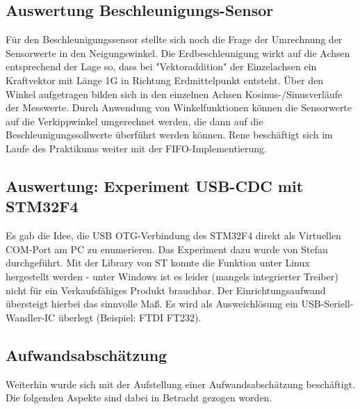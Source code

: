 \subsection{Auswertung Beschleunigungs-Sensor}
Für den Beschleunigungssensor stellte sich noch die Frage der Umrechnung der Sensorwerte in den Neigungswinkel. Die Erdbeschleunigung wirkt auf die Achsen entsprechend der Lage so, dass bei "Vektoraddition" der Einzelachsen ein Kraftvektor mit Länge 1G in Richtung Erdmittelpunkt entsteht. Über den Winkel aufgetragen bilden sich in den einzelnen Achsen Kosinus-/Sinusverläufe der Messwerte. Durch Anwendung von Winkelfunktionen können die Sensorwerte auf die Verkippwinkel umgerechnet werden, die dann auf die Beschleunigungssollwerte überführt werden können. 
Rene beschäftigt sich im Laufe des Praktikums weiter mit der FIFO-Implementierung.

\subsection{Auswertung: Experiment USB-CDC mit STM32F4}
Es gab die Idee, die USB OTG-Verbindung des STM32F4 direkt als Virtuellen COM-Port am PC zu enumerieren. Das Experiment dazu wurde von Stefan durchgeführt. Mit der Library von ST konnte die Funktion unter Linux hergestellt werden - unter Windows ist es leider (mangels integrierter Treiber) nicht für ein Verkaufsfähiges Produkt brauchbar. Der Einrichtungsaufwand übersteigt hierbei das sinnvolle Maß. Es wird als Ausweichlösung ein USB-Seriell-Wandler-IC überlegt (Beispiel: FTDI FT232).

\subsection{Aufwandsabschätzung}
Weiterhin wurde sich mit der Aufstellung einer Aufwandsabschätzung beschäftigt. Die folgenden Aspekte sind dabei in Betracht gezogen worden.
